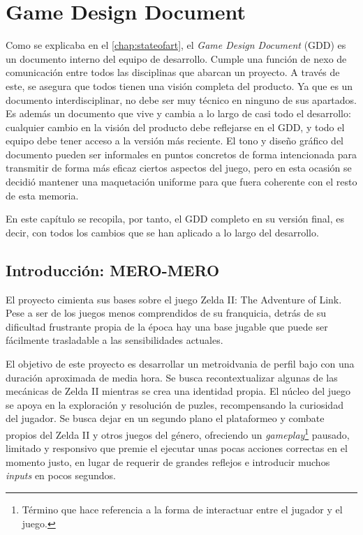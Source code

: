 \chapter{Game Design Document}
\label{chap:gdd}

Como se explicaba en el \autoref{chap:stateofart}, el \textit{Game Design Document} (GDD) es un documento interno del equipo de desarrollo. Cumple una función de nexo de comunicación entre todos las disciplinas que abarcan un proyecto. A través de este, se asegura que todos tienen una visión completa del producto. Ya que es un documento interdisciplinar, no debe ser muy técnico en ninguno de sus apartados. Es además un documento que vive y cambia a lo largo de casi todo el desarrollo: cualquier cambio en la visión del producto debe reflejarse en el GDD, y todo el equipo debe tener acceso a la versión más reciente. El tono y diseño gráfico del documento pueden ser informales en puntos concretos de forma intencionada para transmitir de forma más eficaz ciertos aspectos del juego, pero en esta ocasión se decidió mantener una maquetación uniforme para que fuera coherente con el resto de esta memoria.

En este capítulo se recopila, por tanto, el GDD completo en su versión final, es decir, con todos los cambios que se han aplicado a lo largo del desarrollo.

\section{Introducción: MERO-MERO}

El proyecto cimienta sus bases sobre el juego Zelda II: The Adventure of Link. Pese a ser de los juegos menos comprendidos de su franquicia, detrás de su dificultad frustrante propia de la época hay una base jugable que puede ser fácilmente trasladable a las sensibilidades actuales.

El objetivo de este proyecto es desarrollar un metroidvania de perfil bajo con una duración aproximada de media hora. Se busca recontextualizar algunas de las mecánicas de Zelda II mientras se crea una identidad propia. El núcleo del juego se apoya en la exploración y resolución de puzles, recompensando la curiosidad del jugador. Se busca dejar en un segundo plano el plataformeo y combate propios del Zelda II y otros juegos del género, ofreciendo un \textit{gameplay}\footnote{Término que hace referencia a la forma de interactuar entre el jugador y el juego.} pausado, limitado y responsivo que premie el ejecutar unas pocas acciones correctas en el momento justo, en lugar de requerir de grandes reflejos e introducir muchos \textit{inputs} en pocos segundos. 

